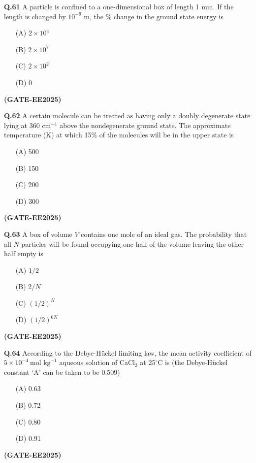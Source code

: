 \documentclass[12pt]{article}
\begin{document}
\begin{enumerate}
\textbf{Q.61} A particle is confined to a one-dimensional box of length 1 mm. If the length is changed by $10^{-9}$ m, the \% change in the ground state energy is

\begin{enumerate}
\item[(A)] $2 \times 10^4$
\item[(B)] $2 \times 10^7$
\item[(C)] $2 \times 10^2$
\item[(D)] 0
\end{enumerate}   \textbf{(GATE-EE2025)}


\vspace{0.5cm}

\textbf{Q.62} A certain molecule can be treated as having only a doubly degenerate state lying at 360 cm$^{-1}$ above the nondegenerate ground state. The approximate temperature (K) at which 15\% of the molecules will be in the upper state is

\begin{enumerate}
\item[(A)] 500
\item[(B)] 150
\item[(C)] 200
\item[(D)] 300
\end{enumerate}   \textbf{(GATE-EE2025)}


\vspace{0.5cm}

\textbf{Q.63} A box of volume $V$ contains one mole of an ideal gas. The probability that all $N$ particles will be found occupying one half of the volume leaving the other half empty is

\begin{enumerate}
\item[(A)] $1/2$
\item[(B)] $2/N$
\item[(C)] $(1/2)^N$
\item[(D)] $(1/2)^{6N}$
\end{enumerate}   \textbf{(GATE-EE2025)}


\vspace{0.5cm}

\textbf{Q.64} According to the Debye-Hückel limiting law, the mean activity coefficient of $5 \times 10^{-4}~\text{mol kg}^{-1}$ aqueous solution of CaCl$_2$ at 25$^\circ$C is (the Debye-Hückel constant ‘A’ can be taken to be 0.509)

\begin{enumerate}
\item[(A)] 0.63
\item[(B)] 0.72
\item[(C)] 0.80
\item[(D)] 0.91
\end{enumerate}   \textbf{(GATE-EE2025)}



\end{enumerate}
\end{document}

